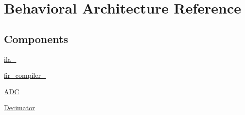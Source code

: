 \hypertarget{class_a_d_c___t_o_p_1_1_behavioral}{\section{Behavioral Architecture Reference}
\label{class_a_d_c___t_o_p_1_1_behavioral}
}
\subsection*{Components}
 \begin{DoxyCompactItemize}
\item 
\hypertarget{class_a_d_c___t_o_p_1_1_behavioral_a0c139f3ef59723b75becd775d3688bf0}{\hyperlink{class_a_d_c___t_o_p_1_1_behavioral_a0c139f3ef59723b75becd775d3688bf0}{ila\-\_}  {\bfseries }  }\label{class_a_d_c___t_o_p_1_1_behavioral_a0c139f3ef59723b75becd775d3688bf0}

\item 
\hypertarget{class_a_d_c___t_o_p_1_1_behavioral_a648278a1b7dd85e5bde5a92b01b1e8cc}{\hyperlink{class_a_d_c___t_o_p_1_1_behavioral_a648278a1b7dd85e5bde5a92b01b1e8cc}{fir\-\_\-compiler\-\_}  {\bfseries }  }\label{class_a_d_c___t_o_p_1_1_behavioral_a648278a1b7dd85e5bde5a92b01b1e8cc}

\item 
\hypertarget{class_a_d_c___t_o_p_1_1_behavioral_ad251174263b28388454816799ffd91ae}{\hyperlink{class_a_d_c___t_o_p_1_1_behavioral_ad251174263b28388454816799ffd91ae}{A\-D\-C}  {\bfseries }  }\label{class_a_d_c___t_o_p_1_1_behavioral_ad251174263b28388454816799ffd91ae}

\item 
\hypertarget{class_a_d_c___t_o_p_1_1_behavioral_a0ff709aca0028081218d6c7b30a5381f}{\hyperlink{class_a_d_c___t_o_p_1_1_behavioral_a0ff709aca0028081218d6c7b30a5381f}{Decimator}  {\bfseries }  }\label{class_a_d_c___t_o_p_1_1_behavioral_a0ff709aca0028081218d6c7b30a5381f}

\end{DoxyCompactItemize}
